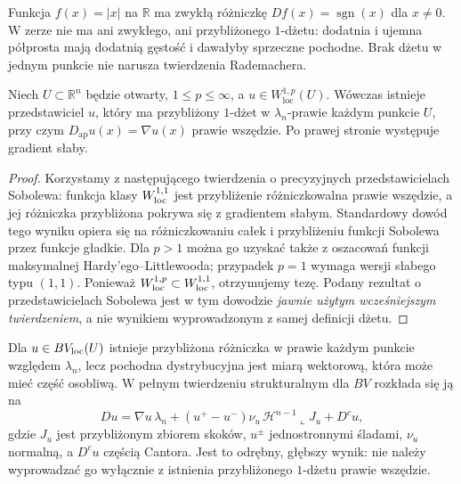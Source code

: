 \begin{przyklad}
Funkcja $f(x)=|x|$ na $\mathbb R$ ma zwykłą różniczkę
$Df(x)=\operatorname{sgn}(x)$ dla $x\ne0$.
W zerze nie ma ani zwykłego, ani przybliżonego
$1$-dżetu: dodatnia i ujemna półprosta mają dodatnią
gęstość i dawałyby sprzeczne pochodne. Brak dżetu w jednym
punkcie nie narusza twierdzenia Rademachera.
\end{przyklad}

\begin{twierdzenie}
\label{thm:dzety-sobolev}
Niech $U\subset\mathbb R^n$ będzie otwarty,
$1\le p\le\infty$, a $u\in W_{\mathrm{loc}}^{1,p}(U)$.
Wówczas istnieje przedstawiciel $u$, który ma
przybliżony $1$-dżet w $\lambda_n$-prawie każdym
punkcie $U$, przy czym
$D_{\mathrm{ap}}u(x)=\nabla u(x)$ prawie wszędzie.
Po prawej stronie występuje gradient słaby.
\end{twierdzenie}
\begin{proof}
Korzystamy z następującego twierdzenia o precyzyjnych
przedstawicielach Sobolewa: funkcja klasy $W^{1,1}_{\rm loc}$
jest przybliżenie różniczkowalna prawie wszędzie, a jej
różniczka przybliżona pokrywa się z gradientem słabym.
Standardowy dowód tego wyniku opiera się na różniczkowaniu
całek i przybliżeniu funkcji Sobolewa przez funkcje gładkie.
Dla $p>1$ można go uzyskać także z oszacowań funkcji
maksymalnej Hardy'ego--Littlewooda; przypadek $p=1$
wymaga wersji słabego typu $(1,1)$. Ponieważ
$W^{1,p}_{\rm loc}\subset W^{1,1}_{\rm loc}$,
otrzymujemy tezę. Podany rezultat o przedstawicielach
Sobolewa jest w tym dowodzie \emph{jawnie użytym
wcześniejszym twierdzeniem}, a nie wynikiem wyprowadzonym
z samej definicji dżetu.
\end{proof}

\begin{uwaga}
\label{rem:dzety-bv}
Dla $u\in BV_{\rm loc}(U)$ istnieje przybliżona
różniczka w prawie każdym punkcie względem $\lambda_n$,
lecz pochodna dystrybucyjna jest miarą wektorową, która
może mieć część osobliwą. W pełnym twierdzeniu
strukturalnym dla $BV$ rozkłada się ją na
\[
 Du=\nabla u\,\lambda_n
 +(u^+-u^-)\nu_u\,\mathcal H^{n-1}\llcorner J_u+D^cu,
\]
gdzie $J_u$ jest przybliżonym zbiorem skoków,
$u^\pm$ jednostronnymi śladami, $\nu_u$ normalną,
a $D^cu$ częścią Cantora. Jest to odrębny, głębszy wynik:
nie należy wyprowadzać go wyłącznie z istnienia
przybliżonego $1$-dżetu prawie wszędzie.
\end{uwaga}

